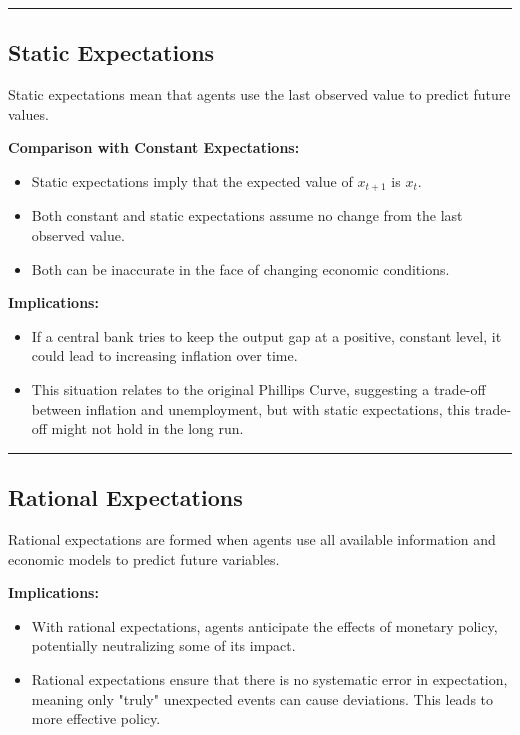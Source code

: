 \documentclass{article}
\begin{document}
\noindent\rule{\linewidth}{0.5pt}

\subsection{Static Expectations}

Static expectations mean that agents use the last observed value to predict future values.

\textbf{Comparison with Constant Expectations:}
\begin{itemize}
    \item Static expectations imply that the expected value of \(x_{t+1}\) is \(x_t\).
    \item Both constant and static expectations assume no change from the last observed value.
    \item Both can be inaccurate in the face of changing economic conditions.
\end{itemize}

\textbf{Implications:}
\begin{itemize}
    \item If a central bank tries to keep the output gap at a positive, constant level, it could lead to increasing inflation over time.
    \item This situation relates to the original Phillips Curve, suggesting a trade-off between inflation and unemployment, but with static expectations, this trade-off might not hold in the long run.
\end{itemize}

\noindent\rule{\linewidth}{0.5pt}

\subsection{Rational Expectations}

Rational expectations are formed when agents use all available information and economic models to predict future variables.

\textbf{Implications:}
\begin{itemize}
    \item With rational expectations, agents anticipate the effects of monetary policy, potentially neutralizing some of its impact.
    \item Rational expectations ensure that there is no systematic error in expectation, meaning only "truly" unexpected events can cause deviations. This leads to more effective policy.
\end{itemize}
\end{document}
